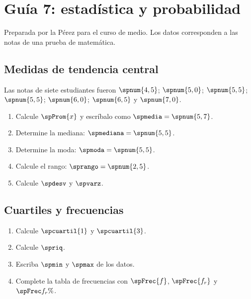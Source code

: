 \documentclass{article}
\begin{document}
\section*{Guía  7: estadística y probabilidad}

Preparada por la  Pérez para el curso de  medio.
Los datos corresponden a las notas de una prueba de matemática.

\subsection*{Medidas de tendencia central}

Las notas de siete estudiantes fueron $\spnum{4,5}$; $\spnum{5,0}$; $\spnum{5,5}$; $\spnum{5,5}$; $\spnum{6,0}$; $\spnum{6,5}$ y $\spnum{7,0}$.

\begin{enumerate}
  \item Calcule $\spProm{x}$ y escríbalo como $\spmedia = \spnum{5,7}$.
  \item Determine la mediana: $\spmediana = \spnum{5,5}$.
  \item Determine la moda: $\spmoda = \spnum{5,5}$.
  \item Calcule el rango: $\sprango = \spnum{2,5}$.
  \item Calcule $\spdesv$ y $\spvarz$.
\end{enumerate}

\subsection*{Cuartiles y frecuencias}

\begin{enumerate}
  \item Calcule $\spcuartil{1}$ y $\spcuartil{3}$.
  \item Calcule $\spriq$.
  \item Escriba $\spmin$ y $\spmax$ de los datos.
  \item Complete la tabla de frecuencias con $\spFrec{f}$, $\spFrec{f_{r}}$ y $\spFrec{f_{r}\%}$.
\end{enumerate}
\end{document}
